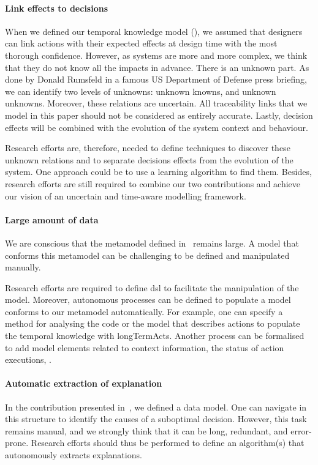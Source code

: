 \paragraph{Link effects to decisions}
When we defined our temporal knowledge model (\cf {}), we assumed that designers can link \glspl{action} with their expected effects at design time with the most thorough confidence. 
However, as systems are more and more complex, we think that they do not know all the impacts in advance.
There is an unknown part.
As done by Donald Rumsfeld in a famous US Department of Defense press briefing, we can identify two levels of unknowns: unknown knowns, and unknown unknowns.
Moreover, these relations are uncertain.
All traceability links that we model in this paper should not be considered as entirely accurate.
Lastly, decision effects will be combined with the evolution of the system context and behaviour.

Research efforts are, therefore, needed to define techniques to discover these unknown relations and to separate decisions effects from the evolution of the system.
One approach could be to use a learning algorithm to find them.
Besides, research efforts are still required to combine our two contributions and achieve our vision of an uncertain and time-aware modelling framework.

\paragraph{Large amount of data}
We are conscious that the \gls{metamodel} defined in~ remains large.
A \gls{model} that conforms this \gls{metamodel} can be challenging to be defined and manipulated manually.

Research efforts are required to define \gls{dsl} to facilitate the manipulation of the \gls{model}.
Moreover, autonomous processes can be defined to populate a \gls{model} conforms to our \gls{metamodel} automatically.
For example, one can specify a method for analysing the code or the model that describes \glspl{action} to populate the temporal knowledge with \glspl{longTermAct}.
Another process can be formalised to add \gls{model} elements related to context information, the status of action executions, \etc.

\paragraph{Automatic extraction of explanation}
In the contribution presented in~, we defined a data model.
One can navigate in this structure to identify the causes of a suboptimal decision.
However, this task remains manual, and we strongly think that it can be long, redundant, and error-prone.
Research efforts should thus be performed to define an algorithm(s) that autonomously extracts explanations.


